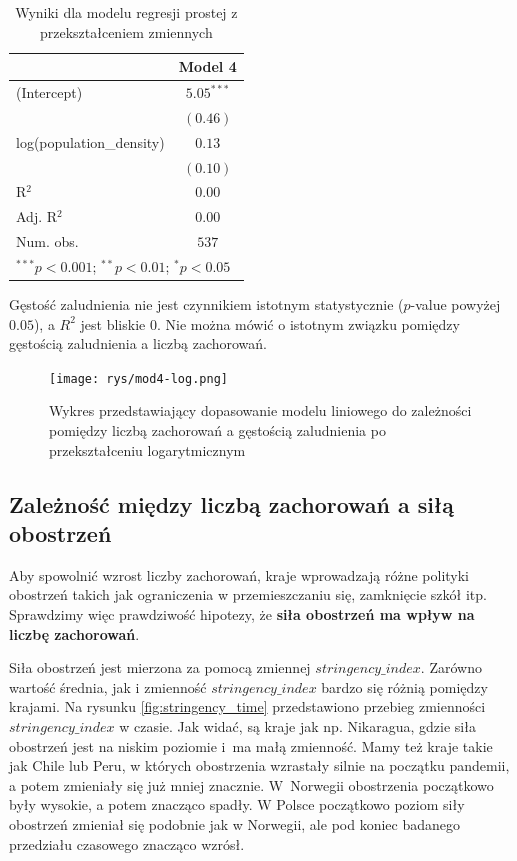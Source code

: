 \documentclass[12pt]{mwbk}
\theoremstyle{plain}
\theoremstyle{definition}
\theoremstyle{definition}
\newcommand\zrodlo[1]{\par\vspace{-3mm}{\small\textit{Źródło: }#1 }}
\begin{document}
\begin{table}[!htbp]
	\begin{center}
		\begin{tabular}{l c}
			\hline
			& Model 4 \\
			\hline
			(Intercept)              & $5.05^{***}$ \\
			& $(0.46)$     \\
			log(population\_density) & $0.13$       \\
			& $(0.10)$     \\
			\hline
			R$^2$                    & $0.00$       \\
			Adj. R$^2$               & $0.00$       \\
			Num. obs.                & $537$        \\
			\hline
			\multicolumn{2}{l}{\scriptsize{$^{***}p<0.001$; $^{**}p<0.01$; $^{*}p<0.05$}}
		\end{tabular}
		\caption{Wyniki dla modelu regresji prostej z przekształceniem zmiennych}
		\label{table:mod4}
	\end{center}
\end{table}

Gęstość zaludnienia nie jest czynnikiem istotnym statystycznie ($p$-value powyżej $0.05$), a $R^2$ jest bliskie 0. Nie można mówić o istotnym związku pomiędzy gęstością zaludnienia a liczbą zachorowań.

\newpage

\begin{figure}[!h]
	\centering
	\texttt{[image: rys/mod4-log.png]}
	\caption{Wykres przedstawiający dopasowanie modelu liniowego do zależności pomiędzy liczbą zachorowań a gęstością zaludnienia po przekształceniu logarytmicznym }
	\label{fig:mod4-lin}
	\zrodlo{Opracowanie własne}
\end{figure}








\subsection{Zależność między liczbą zachorowań a siłą obostrzeń}

Aby spowolnić wzrost liczby zachorowań, kraje wprowadzają różne polityki obostrzeń takich jak ograniczenia w przemieszczaniu się, zamknięcie szkół itp. Sprawdzimy więc prawdziwość hipotezy, że \textbf{siła obostrzeń ma wpływ na liczbę zachorowań}.

Siła obostrzeń jest mierzona za pomocą zmiennej $stringency\_index$. Zarówno wartość średnia, jak i zmienność $stringency\_index$ bardzo się różnią pomiędzy krajami. Na rysunku \ref{fig:stringency_time} przedstawiono przebieg zmienności $stringency\_index$ w czasie. Jak widać, są kraje jak np. Nikaragua, gdzie siła obostrzeń jest na niskim poziomie i~ma małą zmienność. Mamy też kraje takie jak Chile lub Peru, w których obostrzenia wzrastały silnie na początku pandemii, a potem zmieniały się już mniej znacznie. W~Norwegii obostrzenia początkowo były wysokie, a potem znacząco spadły. W Polsce początkowo poziom siły obostrzeń zmieniał się podobnie jak w Norwegii, ale pod koniec badanego przedziału czasowego znacząco wzrósł.
 
\end{document}
